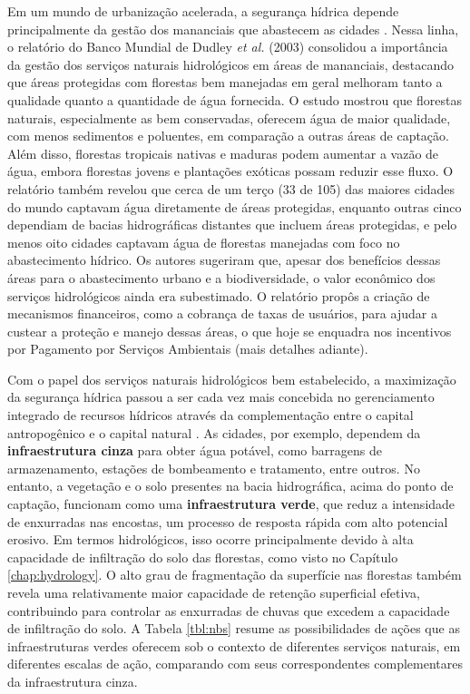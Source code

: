 \documentclass[./main.tex]{subfiles}
\begin{document}
\par Em um mundo de urbanização acelerada, a segurança hídrica depende principalmente da gestão dos mananciais que abastecem as cidades \cite{Liu2024}. Nessa linha, o relatório do Banco Mundial de Dudley \textit{et al.} (2003) \cite{Dudley2003a} consolidou a importância da gestão dos serviços naturais hidrológicos em áreas de mananciais, destacando que áreas protegidas com florestas bem manejadas em geral melhoram tanto a qualidade quanto a quantidade de água fornecida. O estudo mostrou que florestas naturais, especialmente as bem conservadas, oferecem água de maior qualidade, com menos sedimentos e poluentes, em comparação a outras áreas de captação. Além disso, florestas tropicais nativas e maduras podem aumentar a vazão de água, embora florestas jovens e plantações exóticas possam reduzir esse fluxo. O relatório também revelou que cerca de um terço (33 de 105) das maiores cidades do mundo captavam água diretamente de áreas protegidas, enquanto outras cinco dependiam de bacias hidrográficas distantes que incluem áreas protegidas, e pelo menos oito cidades captavam água de florestas manejadas com foco no abastecimento hídrico. Os autores sugeriram que, apesar dos benefícios dessas áreas para o abastecimento urbano e a biodiversidade, o valor econômico dos serviços hidrológicos ainda era subestimado. O relatório propôs a criação de mecanismos financeiros, como a cobrança de taxas de usuários, para ajudar a custear a proteção e manejo dessas áreas, o que hoje se enquadra nos incentivos por Pagamento por Serviços Ambientais (mais detalhes adiante). 

\par Com o papel dos serviços naturais hidrológicos bem estabelecido, a maximização da segurança hídrica passou a ser cada vez mais concebida no gerenciamento integrado de recursos hídricos através da complementação entre o capital antropogênico e o capital natural \cite{un2018}. As cidades, por exemplo, dependem da \textbf{infraestrutura cinza} para obter água potável, como barragens de armazenamento, estações de bombeamento e tratamento, entre outros. No entanto, a vegetação e o solo presentes na bacia hidrográfica, acima do ponto de captação, funcionam como uma \textbf{infraestrutura verde}, que reduz a intensidade de enxurradas nas encostas, um processo de resposta rápida com alto potencial erosivo. Em termos hidrológicos, isso ocorre principalmente devido à alta capacidade de infiltração do solo das florestas, como visto no Capítulo \ref{chap:hydrology}. O alto grau de fragmentação da superfície nas florestas também revela uma relativamente maior capacidade de retenção superficial efetiva, contribuindo para controlar as enxurradas de chuvas que excedem a capacidade de infiltração do solo. A Tabela \ref{tbl:nbs} resume as possibilidades de ações que as infraestruturas verdes oferecem sob o contexto de diferentes serviços naturais, em diferentes escalas de ação, comparando com seus correspondentes complementares da infraestrutura cinza.
\end{document}
